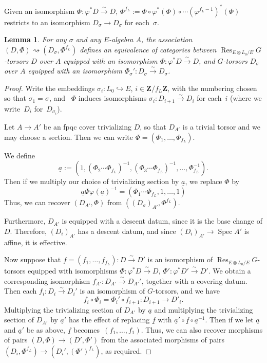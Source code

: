 \documentclass{amsart}
\renewcommand{\mathbb}{\mathbf}
\newcommand{\To}{\longrightarrow}
\newcommand{\isoto}{\stackrel{\sim}{\To}}
\newtheorem{lemma}[subsubsection]{Lemma}
\theoremstyle{definition}
\theoremstyle{remark}
\newcommand{\Z}{\ZZ}
\newcommand{\ZZ}{{\mathbb Z}}
\DeclareMathOperator{\Spec}{Spec}
\newcommand{\Res}{\operatorname{Res}}
\begin{document}
Given an isomorphism
$\Phi:\varphi^\ast D\xrightarrow{\sim}D$,
 $\Phi^{f_L}:=\Phi\circ\varphi^\ast(\Phi)\circ\cdots(\varphi^{f_L-1})^\ast(\Phi)$
restricts to an isomorphism $D_\sigma\rightarrow D_\sigma$ for each~$\sigma$.
\begin{lemma}\label{lemma:d-phi-di-phif}
For any $\sigma$ and any $E$-algebra $A$, the association $(D,\Phi)\rightsquigarrow(D_\sigma,\Phi^{f_L})$ defines an equivalence of categories between $\Res_{E\otimes L_0/E}G$-torsors $D$ over $A$ equipped with an isomorphism $\Phi:\varphi^\ast D\xrightarrow{\sim}D$, and $G$-torsors $D_\sigma$ over $A$ equipped with an isomorphism $\Phi_\sigma':D_\sigma\xrightarrow{\sim}D_\sigma$.
\end{lemma}
\begin{proof}
 Write the embeddings
$\sigma_i:L_0\hookrightarrow E$, $i\in\Z/f_L\Z$, with the numbering
chosen so that $\sigma_1=\sigma$, and ~$\Phi$ induces isomorphisms
$\sigma_i:D_{i+1}\isoto D_i$ for each~$i$ (where we write~$D_i$ for~$D_{\sigma_i}$).
  
Let $A\rightarrow A'$ be an fpqc cover trivializing $D$, so that $D_{A'}$ is a trivial torsor and we may choose a section.  Then we can write $\Phi=(\Phi_1,\ldots,\Phi_{f_L})$.  %
  
We define 
\[	\underline a:=(1,(\Phi_2\cdots\Phi_{f_L})^{-1},(\Phi_3\cdots\Phi_{f_L})^{-1},\ldots,\Phi_{f_L}^{-1}).	\]
 Then if we multiply our choice of trivializing section by $\underline a$, we replace $\Phi$ by
\[	\underline a\Phi\varphi(\underline a)^{-1}=(\Phi_1\cdots\Phi_{f_L},1,\ldots,1)	\]
Thus, we can recover $(D_{A'},\Phi)$ from $((D_\sigma)_{A'},\Phi^{f_L})$.
  
Furthermore, $D_{A'}$ is equipped with a descent datum, since it is the base change of $D$.  Therefore, $(D_i)_{A'}$ has a descent datum, and since $(D_i)_{A'}\rightarrow\Spec A'$ is affine, it is effective.
  
Now suppose that $f=(f_1,\ldots,f_{f_L}):D\xrightarrow{\sim}D'$ is an
isomorphism of $\Res_{E\otimes L_0/E}G$-torsors equipped with
isomorphisms $\Phi:\varphi^\ast D\xrightarrow{\sim}D$,
$\Phi':\varphi^\ast D'\xrightarrow{\sim}D'$.  We obtain a corresponding isomorphism $f_{A'}:D_{A'}\xrightarrow{\sim}D_{A'}'$, together with a covering datum.  Then each $f_i:D_i\xrightarrow{\sim} D_i'$ is an isomorphism of $G$-torsors, and we have
\[	f_i\circ \Phi_{i}=\Phi_{i}'\circ f_{i+1}:D_{i+1}\to D'_i.	\]
Multiplying the trivializing section of $D_{A'}$ by $\underline a$ and multiplying the trivializing section of $D_{A'}$ by $\underline a'$ has the effect of replacing $\underline f$ with $\underline a'\circ \underline f\circ \underline a^{-1}$.  Then if we let $\underline a$ and $\underline a'$ be as above, $\underline f$ becomes~$(f_1,\ldots,f_1)$.
Thus, we can also recover morphisms of pairs $(D,\Phi)\rightarrow
(D',\Phi')$ from the associated morphisms of pairs
$(D_i,\Phi^{f_L})\rightarrow (D_i',(\Phi')^{f_L})$, as required.
   \end{proof}
\end{document}
